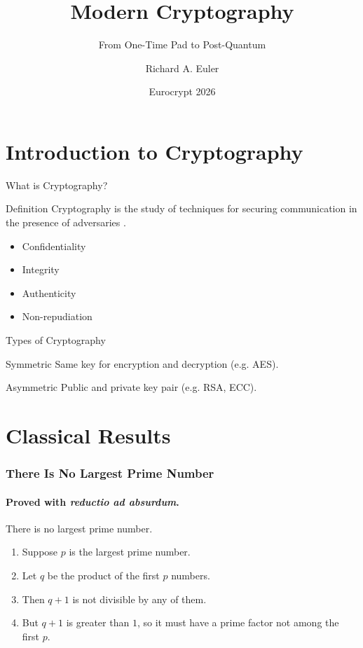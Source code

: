 \documentclass{beamer}
\title[Modern Cryptography]{Modern Cryptography}
\subtitle{From One-Time Pad to Post-Quantum}
\author[N. Surname]{Richard A. Euler}
\institute{Politecnico di Torino}
\date[EC26]{Eurocrypt 2026}
\begin{document}
\begin{frame}
  \titlepage
\end{frame}

\section{Introduction to Cryptography}

\begin{frame}{What is Cryptography?}
\begin{block}{Definition}
Cryptography is the study of techniques for securing communication in the presence of adversaries \cite{BS20,S95}.
\end{block}

\begin{itemize}
\item<1-> Confidentiality
\item<2-> Integrity
\item<3-> Authenticity
\item<4-> Non-repudiation
\end{itemize}
\end{frame}

\begin{frame}{Types of Cryptography}
\begin{exampleblock}{Symmetric}
Same key for encryption and decryption (e.g. AES).
\end{exampleblock}

\begin{alertblock}{Asymmetric}
Public and private key pair (e.g. RSA, ECC).
\end{alertblock}
\end{frame}

\section{Classical Results}

\begin{frame}
\frametitle{There Is No Largest Prime Number}
\framesubtitle{Proved with \textit{reductio ad absurdum}.} 

\begin{theorem}
There is no largest prime number.
\end{theorem}

\begin{enumerate}
  \item<1-| alert@1> Suppose $p$ is the largest prime number.
  \item<2-> Let $q$ be the product of the first $p$ numbers.
  \item<3-> Then $q+1$ is not divisible by any of them.
  \item<4-> But $q + 1$ is greater than $1$, so it must have a prime factor not among the first $p$.
\end{enumerate}
\end{frame}
\end{document}
